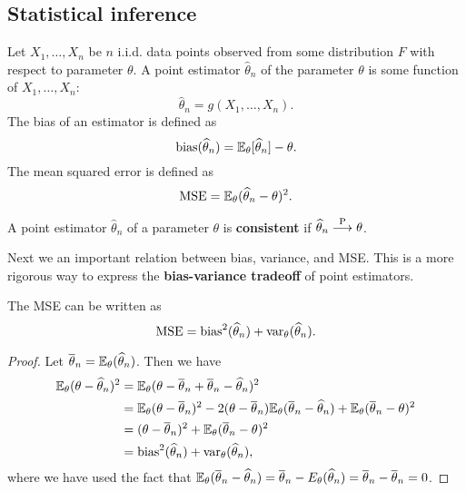 \documentclass[a4paper]{article}
\begin{document}
\subsection{Statistical inference}

\begin{defi}
  Let $X_1, \dots, X_n$ be $n$ i.i.d. data points observed
  from some distribution $F$ with respect to parameter
  $\theta$. A point estimator $\hat{\theta}_n$
  of the parameter $\theta$ is some function of
  $X_1, \dots, X_n$:
  \[
  \hat{\theta}_n = g(X_1, \dots, X_n).
  \]
  The bias of an estimator is defined as
  \[
  \operatorname{bias} (\widehat{\theta}_n)
  = \mathbb{E}_\theta [\widehat{\theta}_n] - \theta.
  \]
  The mean squared error is defined as
  \[
  \operatorname{MSE} = \mathbb{E}_\theta (\widehat{\theta}_n - \theta)^2.
  \]
\end{defi}

\begin{defi}
  A point estimator $\hat\theta_n$ of a parameter
  $\theta$ is \textbf{consistent} if $\widehat{\theta}_n
  \overset{\mathrm{P}}{\longrightarrow} \theta$.
\end{defi}

Next we an important relation between bias, variance,
and MSE. This is a more rigorous way to express the
\textbf{bias-variance tradeoff} of point estimators.

\begin{thm}
The MSE can be written as
\[
\operatorname{MSE} = \operatorname{bias}^2 (\widehat{\theta}_n) + \operatorname{var}_\theta (\widehat{\theta}_n).
\]
\end{thm}

\begin{proof}
  Let $\overline{\theta}_n = \mathbb{E}_\theta (\widehat{\theta}_n)$.
  Then we have
  \[
  \begin{aligned}
    \mathbb{E}_\theta(\theta - \widehat{\theta}_n)^2
    &= \mathbb{E}_\theta(\theta - \overline{\theta}_n + \overline{\theta}_n
    - \widehat{\theta}_n)^2 \\
    &= \mathbb{E}_\theta(\theta - \overline{\theta}_n)^2
    - 2 (\theta - \overline{\theta}_n) \mathbb{E}_\theta (\overline{\theta}_n -
    \widehat{\theta}_n)
    + \mathbb{E}_\theta (\overline{\theta}_n - \theta)^2 \\
    &= (\theta - \overline{\theta}_n)^2
    + \mathbb{E}_\theta (\overline{\theta}_n - \theta)^2 \\
    &= \operatorname{bias}^2(\widehat{\theta}_n) + \operatorname{var}_\theta (\widehat{\theta}_n),
  \end{aligned}
  \]
  where we have used the fact that
  $\mathbb{E}_\theta (\overline{\theta}_n -
  \widehat{\theta}_n) = \overline{\theta}_n - E_\theta(\widehat{\theta}_n)
  = \overline{\theta}_n - \overline{\theta}_n = 0$.
\end{proof}
\end{document}
